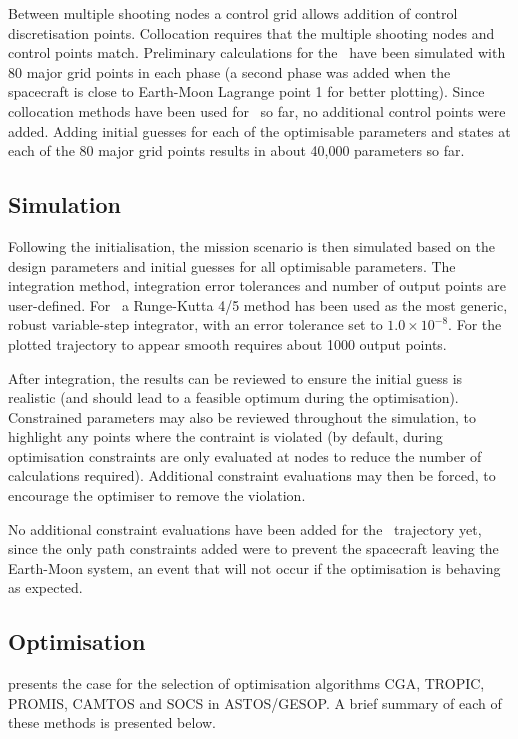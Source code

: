 Between multiple shooting nodes a control grid allows addition of control discretisation points. Collocation requires that the multiple shooting nodes and control points match. Preliminary calculations for the \BW\ have been simulated with 80 major grid points in each phase (a second phase was added when the spacecraft is close to Earth-Moon Lagrange point 1 for better plotting). Since collocation methods have been used for \BW\ so far, no additional control points were added. Adding initial guesses for each of the optimisable parameters and states at each of the 80 major grid points results in about 40,000 parameters so far.

\subsection{Simulation} \label{sub:ASTOS-Simulation}

Following the initialisation, the mission scenario is then simulated based on the design parameters and initial guesses for all optimisable parameters. The integration method, integration error tolerances and number of output points are user-defined. For \BW\ a Runge-Kutta 4/5 method has been used as the most generic, robust variable-step integrator, with an error tolerance set to $1.0\times10^{-8}$. For the plotted trajectory to appear smooth requires about 1000 output
 points.

After integration, the results can be reviewed to ensure the initial guess is realistic (and should lead to a feasible optimum during the optimisation). Constrained parameters may also be reviewed throughout the simulation, to highlight any points where the contraint is violated (by default, during optimisation constraints are only evaluated at nodes to reduce the number of calculations required). Additional constraint evaluations may then be forced, to encourage the optimiser to remove the violation.

No additional constraint evaluations have been added for the \BW\ trajectory yet, since the only path constraints added were to prevent the spacecraft leaving the Earth-Moon system, an event that will not occur if the optimisation is behaving as expected.

\subsection{Optimisation} \label{sub:ASTOS-Optimisation}

\textcite{ASTOS_guide} presents the case for the selection of optimisation algorithms CGA, TROPIC, PROMIS, CAMTOS and SOCS in ASTOS/GESOP. A brief summary of each of these methods is presented below.

